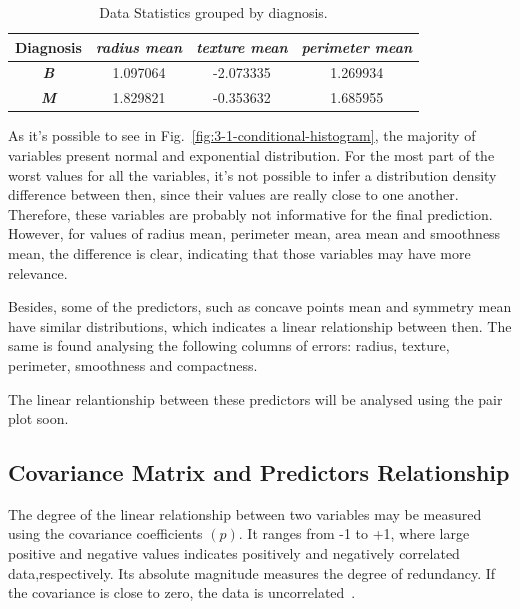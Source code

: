 \documentclass[conference]{IEEEtran}
\begin{document}
\begin{table}[htbp]
\caption{Data Statistics grouped by diagnosis.}
\begin{center}
\begin{tabular}{|c|c|c|c|}
    \hline
    \cline{2-4} 
    \textbf{Diagnosis} & \textbf{\textit{radius mean}}& \textbf{\textit{texture mean}}& \textbf{\textit{perimeter mean}} \\
    \hline
    \textbf{\textit{B}}& 1.097064 &-2.073335 &	1.269934  \\
    \hline
    \textbf{\textit{M}}& 1.829821 & -0.353632 & 1.685955 \\
    \hline
\end{tabular}
\label{tab:Statistics-by-diagnosis}
\end{center}
\end{table}

As it's possible to see in Fig.~\ref{fig:3-1-conditional-histogram}, the majority of variables present normal and exponential distribution. For the most part of the worst values for all the variables, it's not 
possible to infer a distribution density difference between then, since their values 
are really close to one another. Therefore, these variables are probably not 
informative for the final prediction. However, for values of radius mean, perimeter 
mean, area mean and smoothness mean, the difference is clear, indicating that 
those variables may have more relevance. 

Besides, some of the predictors, such as concave points mean and symmetry mean have 
similar distributions, which indicates a linear relationship between then. The same 
is found analysing the following columns of errors: radius, texture, perimeter, 
smoothness and compactness.

The linear relantionship between these predictors will be analysed using the pair 
plot soon.

\subsection{Covariance Matrix and Predictors Relationship}

The degree of the linear relationship between two variables may be measured using the covariance coefficients $(p)$. It ranges from -1 to +1, where large positive and negative values indicates positively and negatively correlated data,respectively. Its absolute magnitude measures the degree of redundancy. If the covariance is close to zero, the data is uncorrelated~\cite{Kuhn2013}.
\end{document}
